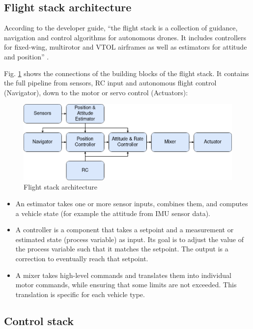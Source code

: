 \documentclass[journal]{IEEEtran}
\begin{document}
\subsection{Flight stack architecture}

According to the developer guide, “the flight stack is a collection of guidance, navigation and control algorithms for autonomous drones. It includes controllers for fixed-wing, multirotor and VTOL airframes as well as estimators for attitude and position” \cite{px4_architecture_flight_stack}.

Fig. \ref{fig:px4_flight_stack} shows the connections of the building blocks of the flight stack. It contains the full pipeline from sensors, RC input and autonomous flight control (Navigator), down to the motor or servo control (Actuators):

\begin{figure}
    \centering
    \includegraphics[scale=0.27]{Images/flight_stack.png}
    \caption{Flight stack architecture}
    \label{fig:px4_flight_stack}
\end{figure}

\begin{itemize}
    \item An estimator takes one or more sensor inputs, combines them, and computes a vehicle state (for example the attitude from IMU sensor data).
    \item A controller is a component that takes a setpoint and a measurement or estimated state (process variable) as input. Its goal is to adjust the value of the process variable such that it matches the setpoint. The output is a correction to eventually reach that setpoint.
    \item A mixer takes high-level commands and translates them into individual motor commands, while ensuring that some limits are not exceeded. This translation is specific for each vehicle type.
\end{itemize}

\subsection{Control stack}
\end{document}
